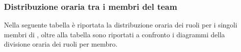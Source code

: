         \subsubsection{Distribuzione oraria tra i membri del team}
            Nella seguente tabella è riportata la distribuzione oraria dei ruoli per i singoli membri di \cod , oltre alla tabella sono riportati a confronto i diagrammi della divisione oraria dei ruoli per membro.
            
            \def\hourlycontent{
            {Andrea Breggion,   5,21,4,11(-7),40(+7),24,105},
            {Matteo Falsetti,   5,5,5,33,27(+7),30(-7),105},
            {Alessandro Flori,  10(+5),4,7,18(-10),27(+4),39,105},
            {Andrea Mascari,    4,6,11(+6),25(-6),33,26,105},
            {Diego Piola,       12,6,9,26,37(+3),15(-3),105},
            {Andrea Signori,    4,6,6,26,36,27,105},
            {Damiano Zanardo,   6,6,5,30,43(+10),15(-10),105},
            {Ore totali,        46(+5),54,47(+6),169(-23),243(+32),176(-20),735},
            }
            


